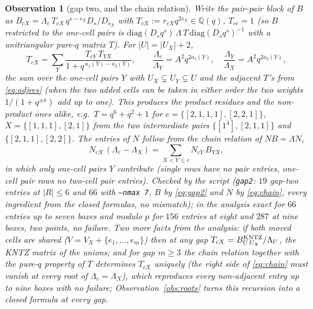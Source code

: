 \documentclass[11pt]{article}
\newtheorem{observation}{Observation}
\newcommand{\Lam}{\Lambda}
\newcommand{\LMPH}[1]{\texttt{#1}}
\begin{document}
\begin{observation}[gap two, and the chain relation]\label{obs:gap2}
Write the pair-pair block of $B$ as $B_{cX}=\Lam_c\,T_{cX}\,q^{s-s_X}D_s/D_{s_X}$ with $T_{cX}:=r_{cX}q^{2s_X}\in\mathbb Q(q)$,
$T_{cc}=1$ (so $B$ restricted to the one-cell pairs is $\mathrm{diag}(D_sq^s)\,\Lam\,T\,\mathrm{diag}(D_sq^s)^{-1}$ with a
unitriangular pure-$q$ matrix $T$).  For $|U|=|U_X|+2$,
\begin{equation}\label{eq:gap2}
T_{cX}=\sum_{Y}\frac{T_{cY}\,T_{YX}}{1+q^{\,a_1(Y)-a_2(Y)}},\qquad
\frac{\Lam_c}{\Lam_Y}=A^2q^{2a_1(Y)},\quad\frac{\Lam_Y}{\Lam_X}=A^2q^{2a_2(Y)},
\end{equation}
the sum over the one-cell pairs $Y$ with $U_X\subsetneq U_Y\subsetneq U$ and the adjacent $T$'s from \eqref{eq:adjres}
(when the two added cells can be taken in either order the two weights $1/(1+q^{\pm a})$ add up to one).  This
produces the product residues and the non-product ones alike, e.g.\ $T=q^6+q^2+1$ for $c=\{[2,1,1,1],[2,2,1]\}$,
$X=\{[1,1,1],[2,1]\}$ from the two intermediate pairs $\{[1^4],[2,1,1]\}$ and $\{[2,1,1],[2,2]\}$.  The entries of $N$
follow from the chain relation of $NB=\Lam N$,
\begin{equation}\label{eq:chain}
N_{cX}\,(\Lam_c-\Lam_X)=\sum_{X<Y\le c}N_{cY}\,B_{YX},
\end{equation}
in which only one-cell pairs $Y$ contribute (single rows have no pair entries, one-cell pair rows no two-cell pair
entries).  Checked by the script (\LMPH{gap2}: $19$ gap-two entries at $|R|\le6$ and $66$ with \LMPH{--nmax 7}, $B$ by
\eqref{eq:gap2} and $N$ by \eqref{eq:chain}, every ingredient from the closed formulas, no mismatch); in the analysis
exact for $66$ entries up to seven boxes and modulo $p$ for $156$ entries at eight and $287$ at nine boxes, two
points, no failure.  Two more facts from the analysis: if both moved cells are shared ($V=V_X+\{e_1,\dots,e_m\}$) then
at any gap $T_{cX}=B^{\rm KNTZ}_{U\,U_X}/\Lam_U$, the KNTZ matrix of the unions; and for gap $m\ge3$ the chain relation
together with the pure-$q$ property of $T$ determines $T_{cX}$ uniquely (the right side of \eqref{eq:chain} must vanish
at every root of $\Lam_c=\Lam_X$), which reproduces every non-adjacent entry up to nine boxes with no failure;
Observation~\ref{obs:roots} turns this recursion into a closed formula at every gap.
\end{observation}
\end{document}

